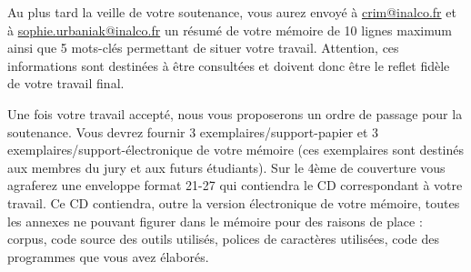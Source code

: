 \documentclass{report}
\begin{document}
Au plus tard la veille de votre soutenance, vous aurez envoyé à \url{crim@inalco.fr} et à \url{sophie.urbaniak@inalco.fr} un résumé de votre mémoire de 10 lignes maximum ainsi que 5 mots-clés permettant de situer votre travail. Attention, ces informations sont destinées à être consultées et doivent donc être le reflet fidèle de votre travail final.

Une fois votre travail accepté, nous vous proposerons un ordre de passage pour la soutenance. Vous devrez fournir 3 exemplaires/support-papier et 3 exemplaires/support-électronique de votre mémoire (ces exemplaires sont destinés aux membres du jury et aux futurs étudiants). Sur le 4ème de couverture vous agraferez une enveloppe format 21-27 qui contiendra le CD correspondant à votre travail. Ce CD contiendra, outre la version électronique de votre mémoire, toutes les annexes ne pouvant figurer dans le mémoire pour des raisons de place : corpus, code source des outils utilisés, polices de caractères utilisées, code des programmes que vous avez élaborés.
\end{document}
